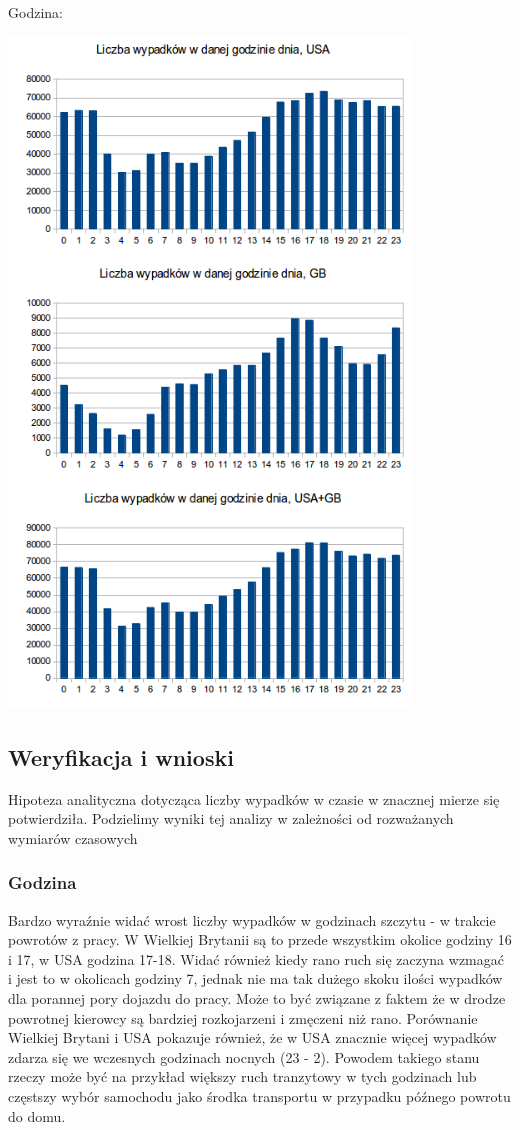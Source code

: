 Godzina:\\\centerline{\includegraphics[width=0.8\textwidth]{images/statistics/hour.png}}

\subsection{Weryfikacja i wnioski}\label{weryfikacja-i-wnioski}

Hipoteza analityczna dotycząca liczby wypadków w czasie w znacznej
mierze się potwierdziła. Podzielimy wyniki tej analizy w zależności od
rozważanych wymiarów czasowych

\subsubsection{Godzina}\label{godzina}

Bardzo wyraźnie widać wrost liczby wypadków w godzinach szczytu - w
trakcie powrotów z pracy. W Wielkiej Brytanii są to przede wszystkim
okolice godziny 16 i 17, w USA godzina 17-18. Widać również kiedy rano
ruch się zaczyna wzmagać i jest to w okolicach godziny 7, jednak nie ma
tak dużego skoku ilości wypadków dla porannej pory dojazdu do pracy.
Może to być związane z faktem że w drodze powrotnej kierowcy są bardziej
rozkojarzeni i zmęczeni niż rano. Porównanie Wielkiej Brytani i USA
pokazuje również, że w USA znacznie więcej wypadków zdarza się we
wczesnych godzinach nocnych (23 - 2). Powodem takiego stanu rzeczy może
być na przykład większy ruch tranzytowy w tych godzinach lub częstszy
wybór samochodu jako środka transportu w przypadku późnego powrotu do
domu.


